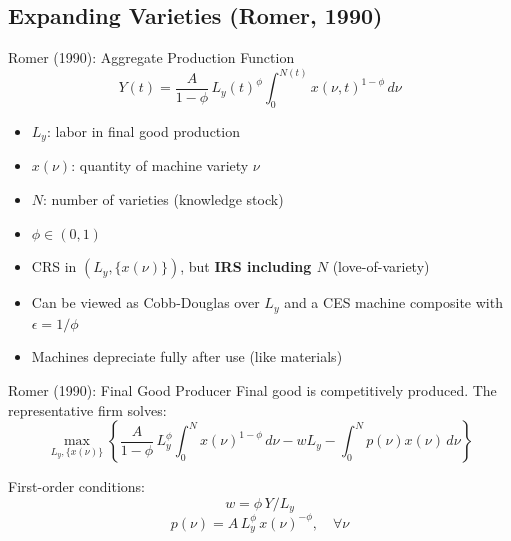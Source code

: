 \documentclass[blue]{beamer}
\begin{document}
	
	\subsection{Expanding Varieties (Romer, 1990)}
	
	\begin{frame}{Romer (1990): Aggregate Production Function}
		\[
		Y(t) = \frac{A}{1-\phi}\, L_y(t)^\phi \int_0^{N(t)} x(\nu, t)^{1-\phi}\, d\nu 
		\]
		
		\begin{itemize}
			\item $L_y$: labor in final good production
			\item $x(\nu)$: quantity of machine variety $\nu$ \item $N$: number of varieties (knowledge stock)
			\item $\phi \in (0,1)$
			\item CRS in $(L_y, \{x(\nu)\})$, but \textbf{IRS including $N$} (love-of-variety)
			\item Can be viewed as Cobb-Douglas over $L_y$ and a CES machine composite with $\epsilon = 1/\phi$
			\item Machines depreciate fully after use (like materials)
		\end{itemize}
	\end{frame}
	
	\begin{frame}{Romer (1990): Final Good Producer}
		Final good is competitively produced. The representative firm solves:
		\[
		\max_{L_y, \{x(\nu)\}} \left\{ \frac{A}{1-\phi}\, L_y^\phi \int_0^N x(\nu)^{1-\phi}\, d\nu - wL_y - \int_0^N p(\nu)x(\nu)\, d\nu \right\} 
		\]
		
		First-order conditions:
		$$
			w = \phi\, Y / L_y  
			$$
			$$
			p(\nu) = A\, L_y^\phi\, x(\nu)^{-\phi}, \quad \forall\nu 
		$$
	\end{frame}
	
\end{document}
